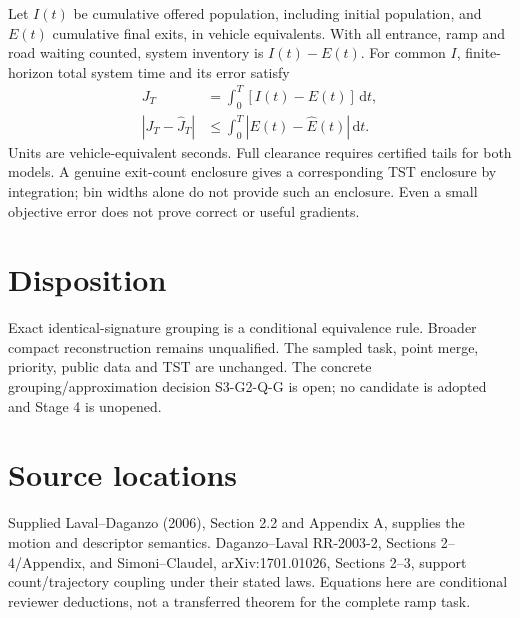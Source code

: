 \documentclass[11pt]{article}
\newcommand{\dd}{\mathrm{d}}
\begin{document}
Let $I(t)$ be cumulative offered population, including initial population, and
$E(t)$ cumulative final exits, in vehicle equivalents. With all entrance,
ramp and road waiting counted, system inventory is $I(t)-E(t)$. For common $I$,
finite-horizon total system time and its error satisfy
\begin{align}
 J_T&=\int_0^T [I(t)-E(t)]\,\dd t,\\
 |J_T-\widehat J_T|&\leq\int_0^T|E(t)-\widehat E(t)|\,\dd t.
 \label{eq:tst}
\end{align}
Units are vehicle-equivalent seconds. Full clearance requires certified tails
for both models. A genuine exit-count enclosure gives a corresponding TST
enclosure by integration; bin widths alone do not provide such an enclosure.
Even a small objective error does not prove correct or useful gradients.

\section*{Disposition}
Exact identical-signature grouping is a conditional equivalence rule. Broader
compact reconstruction remains unqualified. The sampled task, point merge,
priority, public data and TST are unchanged. The concrete grouping/approximation
decision S3-G2-Q-G is open; no candidate is adopted and Stage 4 is unopened.

\section*{Source locations}
Supplied Laval--Daganzo (2006), Section 2.2 and Appendix A, supplies the motion
and descriptor semantics. Daganzo--Laval RR-2003-2, Sections 2--4/Appendix, and
Simoni--Claudel, arXiv:1701.01026, Sections 2--3, support count/trajectory
coupling under their stated laws. Equations here are conditional reviewer
deductions, not a transferred theorem for the complete ramp task.
\end{document}
